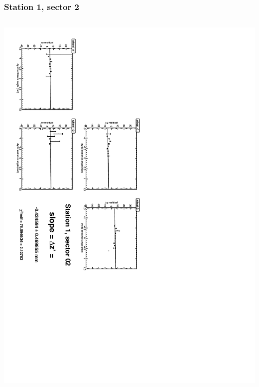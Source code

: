 \documentclass[compress]{beamer}
\begin{document}
\begin{frame}
\frametitle{Station 1, sector 2}
\begin{columns}
\includegraphics[height=\linewidth, angle=90]{zfits/zfit_1_02.pdf}


\end{columns}
\end{frame}
\end{document}
